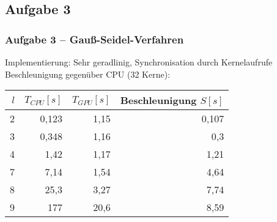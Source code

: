 \documentclass[german,notes,18pt]{beamer}
\begin{document}
	\subsection{Aufgabe 3}
	\begin{frame}
		\frametitle{Aufgabe 3 -- Gauß-Seidel-Verfahren}
		Implementierung: Sehr geradlinig, Synchronisation durch Kernelaufrufe \\
		\vspace{2em}
		Beschleunigung gegenüber CPU (32 Kerne):
		\begin{center}
			\begin{tabular}{r|r|r|r}
			$l$ & $T_{CPU}[s]$ & $T_{GPU}[s]$ & Beschleunigung $S[s]$ \\
			\hline
			2 & 0,123 & 1,15 & \color{lightred}0,107 \\
			3 & 0,348 & 1,16 & \color{lightred}0,3  \\
			4 & 1,42 & 1,17 & 1,21 \\
			\hline
			7 & 7,14 & 1,54 & 4,64 \\
			8 & 25,3 & 3,27 & 7,74 \\
			9 & 177 & 20,6 & 8,59 \\
		\end{tabular}
		\end{center}
	\end{frame}
\end{document}
